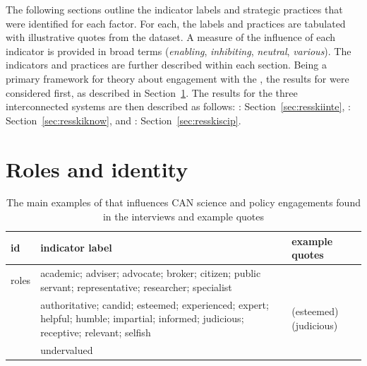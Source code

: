 The following sections outline the indicator labels and strategic practices that were identified for each factor. For each, the labels and practices are tabulated with illustrative quotes from the dataset. A measure of the influence of each indicator is provided in broad terms (\emph{enabling}, \emph{inhibiting}, \emph{neutral}, \emph{various}). The indicators and practices are further described within each section. Being a primary framework for theory about engagement with the \SPI, the results for \skirole{} were considered first, as described in Section~\ref{sec:resroles}. The results for the three interconnected systems are then described as follows: \skiinte: Section~\ref{sec:resskiinte}, \skiknow: Section~\ref{sec:resskiknow}, and \skiscip: Section~\ref{sec:resskiscip}. 

\section{Roles and identity}\label{sec:resroles}

\begin{table}[!ht]
\footnotesize
\caption{The main examples of \ismsr{} that influences CAN science and policy  engagements found in the interviews and example quotes}\label{tab:resrole}
\begin{tabular}{L{.15\linewidth}L{.35\linewidth}L{.5\linewidth}} \hline
\textbf{id} & \textbf{indicator label} & \textbf{example quotes} \\ \hline \hline
roles & academic; adviser; advocate; broker; citizen; public servant; representative; researcher; specialist &   \vfill {} \\[2mm]\rule{0pt}{4ex}
 & authoritative; candid; esteemed; experienced; expert; helpful; humble; impartial; informed; judicious; receptive; relevant; selfish &  (esteemed) \vfill {} (judicious) \\[2mm] \rule{0pt}{4ex}
& undervalued &  \\ \hline
\end{tabular}
\end{table}


